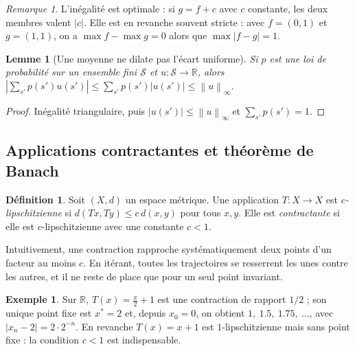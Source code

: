 \documentclass[11pt,a4paper]{article}
\theoremstyle{plain}
\newtheorem{lemme}[theoreme]{Lemme}
\theoremstyle{definition}
\newtheorem{definition}[theoreme]{Définition}
\newtheorem{exemple}[theoreme]{Exemple}
\theoremstyle{remark}
\newtheorem{remarque}[theoreme]{Remarque}
\newcommand{\R}{\mathbb{R}}
\newcommand{\cS}{\mathcal{S}}
\newcommand{\ninf}[1]{\left\lVert #1 \right\rVert_\infty}
\newcommand{\abs}[1]{\left\lvert #1 \right\rvert}
\newcommand{\1}{\mathbf{1}}
\begin{document}
\begin{remarque}
L'inégalité est optimale : si $g=f+c$ avec $c$ constante, les deux membres valent $\abs c$. Elle est en revanche souvent stricte : avec $f=(0,1)$ et $g=(1,1)$, on a $\max f-\max g=0$ alors que $\max\abs{f-g}=1$.
\end{remarque}

\begin{lemme}[Une moyenne ne dilate pas l'écart uniforme]\label{lem-moyenne}
Si $p$ est une loi de probabilité sur un ensemble fini $\cS$ et $u:\cS\to\R$, alors $\abs{\sum_{s'}p(s')u(s')}\le\sum_{s'}p(s')\abs{u(s')}\le\ninf{u}$.
\end{lemme}
\begin{proof}
Inégalité triangulaire, puis $\abs{u(s')}\le\ninf u$ et $\sum_{s'}p(s')=1$.
\end{proof}

\subsection{Applications contractantes et théorème de Banach}

\begin{definition}
Soit $(X,d)$ un espace métrique. Une application $T:X\to X$ est \emph{$c$-lipschitzienne} si $d(Tx,Ty)\le c\,d(x,y)$ pour tous $x,y$. Elle est \emph{contractante} si elle est $c$-lipschitzienne avec une constante $c<1$.
\end{definition}

Intuitivement, une contraction rapproche systématiquement deux points d'un facteur au moins $c$. En itérant, toutes les trajectoires se resserrent les unes contre les autres, et il ne reste de place que pour un seul point invariant.

\begin{exemple}
Sur $\R$, $T(x)=\frac{x}{2}+1$ est une contraction de rapport $1/2$ ; son unique point fixe est $x^*=2$ et, depuis $x_0=0$, on obtient $1,\ 1.5,\ 1.75,\ \dots$, avec $\abs{x_n-2}=2\cdot2^{-n}$. En revanche $T(x)=x+1$ est $1$-lipschitzienne mais sans point fixe : la condition $c<1$ est indispensable.
\end{exemple}
\end{document}
